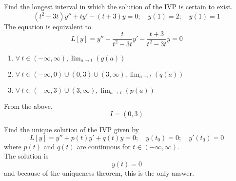 \documentclass[twoside]{report}
\begin{document}
    \begin{example}
        Find the longest interval in which the solution of the IVP is certain to exist.
        \begin{equation}
            (t^{2}-3t)y'' + ty' - (t + 3) y = 0;\quad y(1) = 2;\quad y(1) = 1
        \end{equation}
        The equation is equivalent to
        \begin{equation}
            L[y] = y'' + \frac{t}{t^{2} - 3t}y' - \frac{t + 3}{{t^{2} - 3t}}y = 0
        \end{equation}
        \begin{enumerate}
            \item $\forall\ t \in (-\infty, \infty), \lim_{a\to t}(g(a))$
            \item $\forall\ t \in (-\infty, 0)\cup(0, 3)\cup(3,\infty), \lim_{a\to t}(q(a))$
            \item $\forall\ t \in (-\infty, 3)\cup(3,\infty), \lim_{a\to t}(p(a))$
        \end{enumerate}
        From the above,
        \begin{equation}
            I = (0, 3)
        \end{equation}
    \end{example}
    \begin{example}
        Find the unique solution of the IVP given by
        \begin{equation}
            L[y] = y'' + p(t)y' + q(t) y = 0;\quad y(t_{0}) = 0;\quad y'(t_{0}) = 0
        \end{equation}
        where $p(t)$ and $q(t)$ are continuous for $t \in (-\infty, \infty)$.\\
        The solution is
        \begin{equation}
            y(t) = 0
        \end{equation}
        and because of the uniqueness theorem, this is the only answer.
    \end{example}
    \np
\end{document}
